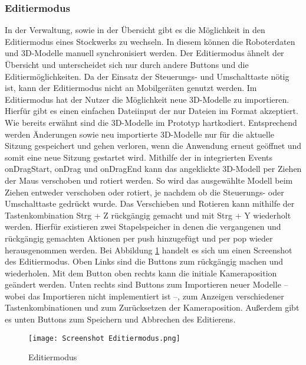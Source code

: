 \subsubsection{Editiermodus}\label{sec:EditMode}
In der Verwaltung, sowie in der Übersicht gibt es die Möglichkeit in den Editiermodus eines Stockwerks zu wechseln. In diesem können die Roboterdaten und 3D-Modelle manuell synchronisiert werden. Der Editiermodus ähnelt der Übersicht und unterscheidet sich nur durch andere Buttons und die Editiermöglichkeiten. Da der Einsatz der Steuerungs- und Umschalttaste nötig ist, kann der Editiermodus nicht an Mobilgeräten genutzt werden. Im Editiermodus hat der Nutzer die Möglichkeit neue 3D-Modelle zu importieren. Hierfür gibt es einen einfachen Dateiinput der nur Dateien im \glb{} Format akzeptiert. Wie bereits erwähnt sind die 3D-Modelle im Prototyp hartkodiert. Entsprechend werden Änderungen sowie neu importierte 3D-Modelle nur für die aktuelle Sitzung gespeichert und gehen verloren, wenn die Anwendung erneut geöffnet und somit eine neue Sitzung gestartet wird. Mithilfe der in \deckgl{} integrierten Events onDragStart, onDrag und onDragEnd \cite{DeckglInteractivity} kann das angeklickte 3D-Modell per Ziehen der Maus verschoben und rotiert werden. So wird das ausgewählte Modell beim Ziehen entweder verschoben oder rotiert, je nachdem ob die Steuerungs- oder Umschalttaste gedrückt wurde. Das Verschieben und Rotieren kann mithilfe der Tastenkombination Strg + Z rückgängig gemacht und mit Strg + Y wiederholt werden. Hierfür existieren zwei Stapelspeicher in denen die vergangenen und rückgängig gemachten Aktionen per push hinzugefügt und per pop wieder herausgenommen werden. Bei Abbildung \ref{fig:EditmodeScreenshot} handelt es sich um einen Screenshot des Editiermodus. Oben Links sind die Buttons zum rückgängig machen und wiederholen. Mit dem Button oben rechts kann die initiale Kameraposition geändert werden. Unten rechts sind Buttons zum Importieren neuer Modelle – wobei das Importieren nicht implementiert ist –, zum Anzeigen verschiedener Tastenkombinationen und zum Zurücksetzen der Kameraposition. Außerdem gibt es unten Buttons zum Speichern und Abbrechen des Editierens.

\begin{figure}[H]
    \caption{Editiermodus}\label{fig:EditmodeScreenshot}
    \texttt{[image: Screenshot Editiermodus.png]}
\end{figure}

